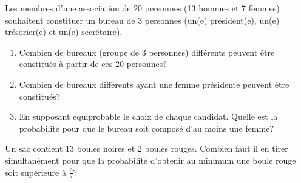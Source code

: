 \documentclass[a4paper]{article}
\newif\ifcorrection
\begin{document}
\exost
Les membres d'une association de 20 personnes (13 hommes et 7 femmes) souhaitent constituer un bureau de 3 personnes (un(e) pr\'esident(e), un(e) tr\'esorier(e)
et un(e) secr\'etaire).
\begin{enumerate}
 \item Combien de bureaux (groupe de 3 personnes) diff\'erents peuvent \^etre constitu\'es \`a partir de ces 20 personnes?
 \ifcorrection
 \textcolor{red}{
  On applique la formule d'un tirage ordonn\'e de 3 \'el\'ements parmis 20 $A_{20}^3 = \frac{20!}{17!} = 20 \times 19 \times 18 = 6840$.
  }
  \else
 \fi
 \item Combien de bureaux diff\'erents ayant une femme pr\'esidente peuvent \^etre constitu\'es?
  \ifcorrection
  \textcolor{red}{
  On applique la formule d'un tirage ordonn\'e de 2 \'el\'ements parmis 19: $A_{19}^2 = \frac{19!}{17!} = 19 \times 18  = 342$.
  Comme il y a 7 femmes, alors au total il y a $7 \times 342 = 2394$ bureaux possibles avec 1 femme pr\'esidente.
  (et donc $13 \times 342 = 4446$ bureaux avec 1 homme pr\'esident). On v\'erifie que $2394 + 4446 = 6840$ correspond au total.  
  }
 \fi
 \item En supposant \'equiprobable le choix de chaque candidat. Quelle est la probabilit\'e pour que le bureau soit compos\'e d'au moins une femme?
  \ifcorrection
  \textcolor{red}{
  -On note $F$ l'\'ev\'enement, $\{\text{``une femme est dans le bureau''}\}$ et son compl\'ementaire $\bar{F}=\{\text{``Il n'y a pas de femme dans le bureau''} \}$.
  Le tirage de chaque candidat est ind\'ependant donc:
  $P(\bar{F}) = \frac{13}{20} \frac{12}{19} \frac{11}{18} = \frac{1716}{6840} \approx 0,25$.
  Donc $P(F) = 1 - P(\bar{F}) \approx 0,75$.\\
  -Autre solution: Il y a $A_{13}^3$ arrangements de 3 hommes, donc $P(\bar{F}) = \frac{A_{13}^3}{A_{20}^3} = \frac{\frac{13!}{(13-3)!}}{\frac{20!}{(20-3)!}}=\frac{13\times 12 \times 11}{20\times 19 \times 18}\approx 0,25$\\
  -Autre solution: On \'enum\`ere toutes les combinaisons (avec au moins 1F): 3F: $C_7^3$, 2F1M: $C_7^2 C_{13}^1$, 1F2M: $C_7^1C_{13}^2$, donc
  $P(F) = \frac{C_7^3 + (C_7^2C_{13}^1) + (C_7^1C_{13}^2)}{C_{20}^3} = \frac{854}{1140} \approx 0,75$.
  }
  \else
 \fi
\end{enumerate}

\exost 
Un sac contient 13 boules noires et 2 boules rouges. Combien faut il en tirer simultan\'ement
pour que la probabilit\'e d'obtenir au minimum une boule rouge soit sup\'erieure \`a $\frac{6}{7}$?
\end{document}
